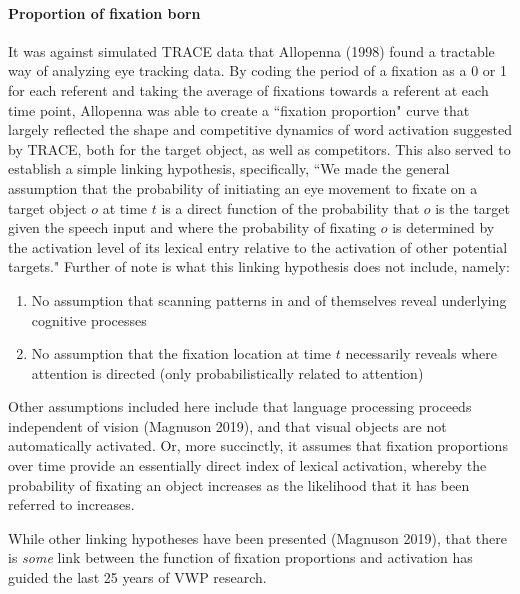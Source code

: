 \documentclass{article}
\begin{document}
\paragraph{Proportion of fixation born} It was against simulated TRACE data that Allopenna (1998) found a tractable way of analyzing eye tracking data. By coding the period of a fixation as a 0 or 1 for each referent and taking the average of fixations towards a referent at each time point, Allopenna was able to create a ``fixation proportion" curve that largely reflected the shape and competitive dynamics of word activation suggested by TRACE, both for the target object, as well as competitors. This also served to establish a simple linking hypothesis, specifically, ``We made the general assumption that the probability of initiating an eye movement to fixate on a target object $o$ at time $t$ is a direct function of the probability that $o$ is the target given the speech input and where the probability of fixating $o$ is determined by the activation level of its lexical entry relative to the activation of other potential targets." Further of note is what this linking hypothesis does not include, namely:

\begin{singlespace}
\begin{enumerate}
\vspace{-3mm}
\item No assumption that scanning patterns in and of themselves reveal underlying cognitive processes
\item No assumption that the fixation location at time $t$ necessarily reveals where attention is directed (only probabilistically related to attention)
\end{enumerate}
\end{singlespace}

Other assumptions included here include that language processing proceeds independent of vision (Magnuson 2019), and that visual objects are not automatically activated. Or, more succinctly, it assumes that fixation proportions over time provide an essentially direct index of lexical activation, whereby the probability of fixating an object increases as the likelihood that it has been referred to increases.


While other linking hypotheses have been presented (Magnuson 2019), that there is \textit{some} link between the function of fixation proportions and activation has guided the last 25 years of VWP research.
\end{document}
